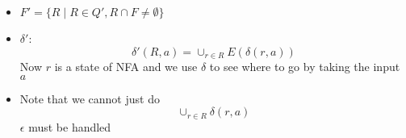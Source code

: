 \begin{frame}[allowframebreaks]
\begin{itemize}
\begin{itemize}
\begin{equation*}
{reached by $\epsilon$ from $q_0$}\}
\end{equation*}
We call such a set $E(\{q_0\})$
\item $F'=
\{R\mid R \in Q', R \cap F\neq \emptyset\}$
\item $\delta'$:
  \begin{equation*}
    \delta'(R,a)=
\cup_{r\in R} E(\delta(r,a))
\end{equation*}
Now $r$ is a state of NFA and we use $\delta$ to see where to go
by taking the input $a$
\item Note that we cannot just do
\begin{equation*}
\cup_{r\in R}\delta(r,a)
\end{equation*}
$\epsilon$ must be handled
\end{itemize}
\end{itemize}
\end{frame}


